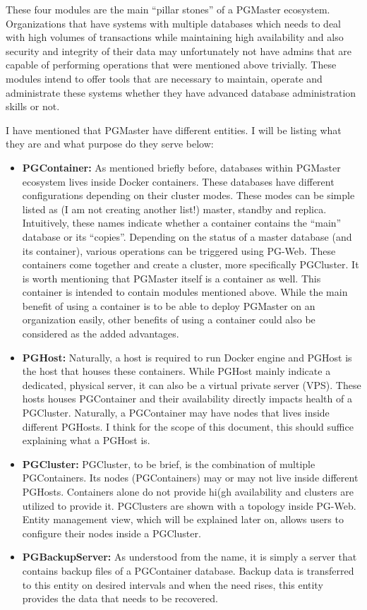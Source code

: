 These four modules are the main ``pillar stones'' of a PGMaster ecosystem. 
Organizations that have systems with multiple databases which needs to deal 
with high volumes of transactions while maintaining high availability and 
also security and integrity of their data may unfortunately not have admins 
that are capable of performing operations that were mentioned above trivially. 
These modules intend to offer tools that are necessary to maintain, operate 
and administrate these systems whether they have advanced database 
administration skills or not.
\par
I have mentioned that PGMaster have different entities. I will be listing 
what they are and what purpose do they serve below:
\begin{itemize}
    \item \textbf{PGContainer:} As mentioned briefly before, databases 
    within PGMaster ecosystem lives inside Docker containers. These databases 
    have different configurations depending on their cluster modes. These 
    modes can be simple listed as (I am not creating another list!) master, 
    standby and replica. Intuitively, these names indicate whether a container 
    contains the ``main'' database or its ``copies''. Depending on the status 
    of a master database (and its container), various operations can be 
    triggered using PG-Web. These containers come together and create a 
    cluster, more specifically PGCluster. It is worth mentioning that PGMaster 
    itself is a container as well. This container is intended to contain 
    modules mentioned above. While the main benefit of using a container is 
    to be able to deploy PGMaster on an organization easily, other benefits of 
    using a container could also be considered as the added advantages.
    \item \textbf{PGHost:} Naturally, a host is required to run Docker engine 
    and PGHost is the host that houses these containers. While PGHost mainly 
    indicate a dedicated, physical server, it can also be a virtual private 
    server (VPS). These hosts houses PGContainer and their availability 
    directly impacts health of a PGCluster. Naturally, a PGContainer may have 
    nodes that lives inside different PGHosts. I think for the scope of this 
    document, this should suffice explaining what a PGHost is.
    \item \textbf{PGCluster:} PGCluster, to be brief, is the combination of 
    multiple PGContainers. Its nodes (PGContainers) may or may not live inside 
    different PGHosts. Containers alone do not provide hi(gh availability and 
    clusters are utilized to provide it. PGClusters are shown with a topology 
    inside PG-Web. Entity management view, which will be explained later on,
    allows users to configure their nodes inside a PGCluster.
    \item \textbf{PGBackupServer:} As understood from the name, it is simply 
    a server that contains backup files of a PGContainer database. Backup 
    data is transferred to this entity on desired intervals and when the need 
    rises, this entity provides the data that needs to be recovered.
\end{itemize}


